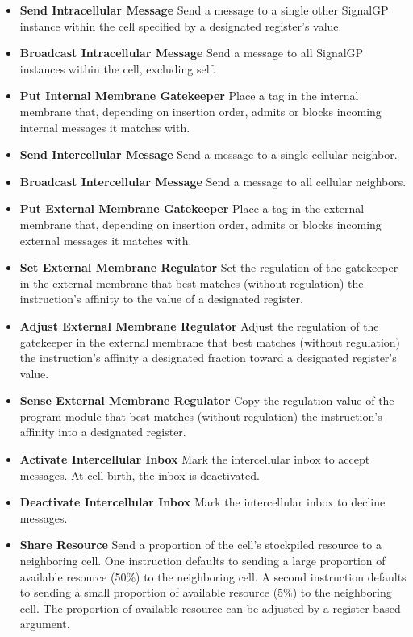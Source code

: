 \begin{itemize}
\item \textbf{Send Intracellular Message}
Send a message to a single other SignalGP instance within the cell specified by a designated register's value.
\item \textbf{Broadcast Intracellular Message}
Send a message to all SignalGP instances within the cell, excluding self.
\item \textbf{Put Internal Membrane Gatekeeper}
Place a tag in the internal membrane that, depending on insertion order, admits or blocks incoming internal messages it matches with.
\item \textbf{Send Intercellular Message}
Send a message to a single cellular neighbor.
\item \textbf{Broadcast Intercellular Message}
Send a message to all cellular neighbors.
\item \textbf{Put External Membrane Gatekeeper}
Place a tag in the external membrane that, depending on insertion order, admits or blocks incoming external messages it matches with.
\item \textbf{Set External Membrane Regulator}
Set the regulation of the gatekeeper in the external membrane that best matches (without regulation) the instruction's affinity to the value of a designated register.
\item \textbf{Adjust External Membrane Regulator}
Adjust the regulation of the gatekeeper in the external membrane that best matches (without regulation) the instruction's affinity a designated fraction toward a designated register's value.
\item \textbf{Sense External Membrane Regulator}
Copy the regulation value of the program module that best matches (without regulation) the instruction's affinity into a designated register.
\item \textbf{Activate Intercellular Inbox}
Mark the intercellular inbox to accept messages.
At cell birth, the inbox is deactivated.
\item \textbf{Deactivate Intercellular Inbox}
Mark the intercellular inbox to decline messages.
\item \textbf{Share Resource}
Send a proportion of the cell's stockpiled resource to a neighboring cell.
One instruction defaults to sending a large proportion of available resource (50\%) to the neighboring cell.
A second instruction defaults to sending a small proportion of available resource (5\%) to the neighboring cell.
The proportion of available resource can be adjusted by a register-based argument.

\end{itemize}
